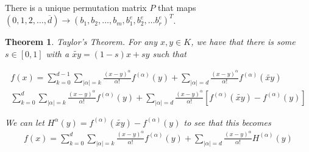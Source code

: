 \documentclass{article}
\newtheorem{theorem}{Theorem}[section]
\theoremstyle{case}
\newcommand{\bidx}{{\mathcal I}}
\begin{document}

There is a unique permutation matrix $P$ that maps $(0, 1, 2, \ldots, \overline{d}) \to (b_1, b_2, \ldots, b_m, b^e_1, b^e_2, \ldots b^e_r)^T$.






\begin{theorem}{Taylor's Theorem.}
For any $x, y \in K$, we have that there is some $s \in [0,1]$ with a $\tilde{xy} = (1-s)x + sy$  such that

\begin{align*}
f(x) = \sum_{k=0}^{d-1} \sum_{|\alpha| = k} \frac{\left(x - y\right)^{\alpha}}{\alpha!}f^{(\alpha)}(y) + \sum_{|\alpha|=d}\frac{\left(x - y\right)^{\alpha}}{\alpha!} f^{(\alpha)}(\tilde{xy}) \\
\sum_{k=0}^{d} \sum_{|\alpha| = k} \frac{\left(x - y\right)^{\alpha}}{\alpha!}f^{(\alpha)}(y) + \sum_{|\alpha|=d}\frac{\left(x - y\right)^{\alpha}}{\alpha!} \left[f^{(\alpha)}(\tilde{xy}) - f^{(\alpha)}(y)\right]
\end{align*}

We can let $H^{\alpha}(y) = f^{(\alpha)}(\tilde{xy}) - f^{(\alpha)}(y)$ to see that this becomes
\begin{align}
f(x) = \sum_{k=0}^{d} \sum_{|\alpha| = k} \frac{\left(x - y\right)^{\alpha}}{\alpha!}f^{(\alpha)}(y) + \sum_{|\alpha|=d}\frac{\left(x - y\right)^{\alpha}}{\alpha!} H^{(\alpha)}(y) \label{taylors_theorem}
\end{align}

\end{theorem}
\end{document}
